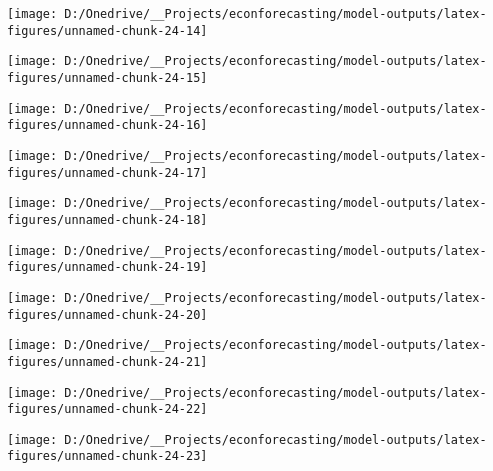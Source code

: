 \documentclass[11pt, letterpaper]{article}\usepackage[]{graphicx}\usepackage[]{color}
\begin{document}
{\centering \texttt{[image: D:/Onedrive/\_\_Projects/econforecasting/model-outputs/latex-figures/unnamed-chunk-24-14]} 

}




{\centering \texttt{[image: D:/Onedrive/\_\_Projects/econforecasting/model-outputs/latex-figures/unnamed-chunk-24-15]} 

}




{\centering \texttt{[image: D:/Onedrive/\_\_Projects/econforecasting/model-outputs/latex-figures/unnamed-chunk-24-16]} 

}




{\centering \texttt{[image: D:/Onedrive/\_\_Projects/econforecasting/model-outputs/latex-figures/unnamed-chunk-24-17]} 

}




{\centering \texttt{[image: D:/Onedrive/\_\_Projects/econforecasting/model-outputs/latex-figures/unnamed-chunk-24-18]} 

}




{\centering \texttt{[image: D:/Onedrive/\_\_Projects/econforecasting/model-outputs/latex-figures/unnamed-chunk-24-19]} 

}




{\centering \texttt{[image: D:/Onedrive/\_\_Projects/econforecasting/model-outputs/latex-figures/unnamed-chunk-24-20]} 

}




{\centering \texttt{[image: D:/Onedrive/\_\_Projects/econforecasting/model-outputs/latex-figures/unnamed-chunk-24-21]} 

}




{\centering \texttt{[image: D:/Onedrive/\_\_Projects/econforecasting/model-outputs/latex-figures/unnamed-chunk-24-22]} 

}




{\centering \texttt{[image: D:/Onedrive/\_\_Projects/econforecasting/model-outputs/latex-figures/unnamed-chunk-24-23]} 

}
\end{document}
